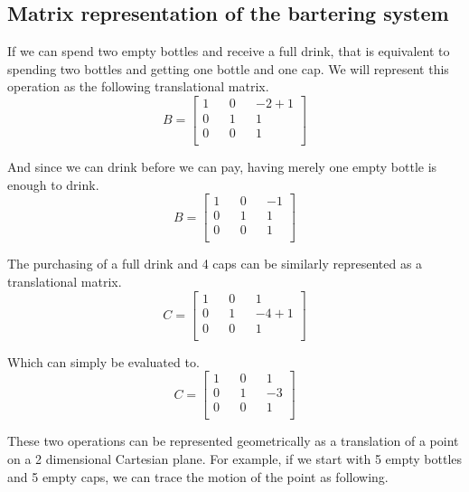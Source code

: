 \documentclass[letterpaper, 12pt]{article}
\begin{document}
\subsection{Matrix representation of the bartering system}
\par If we can spend two empty bottles and receive a full drink, that is equivalent to spending two bottles and getting one bottle and one cap.
We will represent this operation as the following translational matrix.
\[
	B=
	\begin{bmatrix}
		1 && 0 && -2 + 1\\
		0 && 1 &&  1\\
		0 && 0 &&  1\\
	\end{bmatrix}
\]
\par And since we can drink before we can pay, having merely one empty bottle is enough to drink.
\[
	B=
	\begin{bmatrix}
		1 && 0 && -1\\
		0 && 1 &&  1\\
		0 && 0 &&  1\\
	\end{bmatrix}
\]
\par The purchasing of a full drink and 4 caps can be similarly represented as a translational matrix.
\[
	C=
	\begin{bmatrix}
		1 && 0 &&  1\\
		0 && 1 && -4 + 1\\
		0 && 0 &&  1\\
	\end{bmatrix}
\]
\par Which can simply be evaluated to.
\[
	C=
	\begin{bmatrix}
		1 && 0 &&  1\\
		0 && 1 && -3\\
		0 && 0 &&  1\\
	\end{bmatrix}
\]
\par These two operations can be represented geometrically as a translation of a point on a 2 dimensional Cartesian plane.
For example, if we start with 5 empty bottles and 5 empty caps, we can trace the motion of the point as following.
\begin{center}
\end{center}
\end{document}
